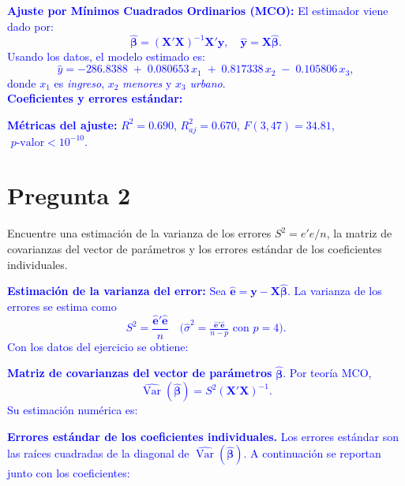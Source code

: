 \documentclass[10pt]{article}
\begin{document}
    \textcolor{blue}{
        \textbf{Ajuste por Mínimos Cuadrados Ordinarios (MCO):} El estimador viene dado por:
        \[
        \hat{\boldsymbol{\beta}}=(\mathbf{X}'\mathbf{X})^{-1}\mathbf{X}'\mathbf{y},\quad \hat{\mathbf{y}}=\mathbf{X}\hat{\boldsymbol{\beta}}.
        \]
        Usando los datos, el modelo estimado es:
        \[
        \widehat{y}= -286.8388\; +\; 0.080653\, x_1\; +\; 0.817338\, x_2\; -\; 0.105806\, x_3,
        \]
        \noindent donde $x_1$ es \emph{ingreso}, $x_2$ \emph{menores} y $x_3$ \emph{urbano}. \\
        \noindent \textbf{Coeficientes y errores estándar:}
        
        \noindent \textbf{Métricas del ajuste:} $R^2=0.690$, $R^2_{aj}=0.670$, $F(3,47)=34.81$, $\,\,p\text{-valor}<10^{-10}$.\\
        
    }
\section{Pregunta 2}
Encuentre una estimación de la varianza de los errores $S^2 = e'e/n$, la matriz de covarianzas del vector de parámetros y los errores estándar de los coeficientes individuales. \\

\textcolor{blue}{
    \textbf{Estimación de la varianza del error:}
    Sea $\hat{\mathbf e}=\mathbf y-\mathbf X\hat{\boldsymbol\beta}$. La varianza de los errores se estima como
    \[
        S^2 = \frac{\hat{\mathbf e}'\hat{\mathbf e}}{n}
        \quad \text{(} \widehat{\sigma}^2 = \tfrac{\hat{\mathbf e}'\hat{\mathbf e}}{n-p} \text{ con } p=4\text{)}.
    \]
    Con los datos del ejercicio se obtiene:
    
    \textbf{Matriz de covarianzas del vector de parámetros} $\hat{\boldsymbol\beta}$.
    Por teoría MCO,
    \[
        \widehat{\operatorname{Var}}(\hat{\boldsymbol\beta}) = S^2 (\mathbf X'\mathbf X)^{-1}.
    \]
    Su estimación numérica es:
    
    \textbf{Errores estándar de los coeficientes individuales.}
    Los errores estándar son las raíces cuadradas de la diagonal de $\widehat{\operatorname{Var}}(\hat{\boldsymbol\beta})$. A continuación se reportan junto con los coeficientes:
    
}
\end{document}
